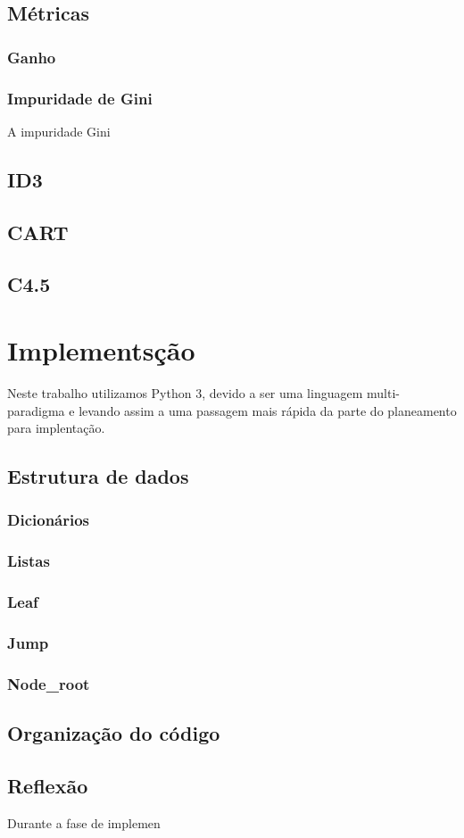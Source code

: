\documentclass[12pt,a4paper]{article}
\begin{document}
\subsection{Métricas}
\subsubsection{Ganho}

\subsubsection{Impuridade de Gini}
A impuridade Gini

\subsection{ID3}

\subsection{CART}

\subsection{C4.5}

\section{Implementsção}
Neste trabalho utilizamos Python 3, devido a ser uma linguagem multi-paradigma e levando assim a uma passagem mais rápida da parte do planeamento para implentação.
\subsection{Estrutura de dados}

\subsubsection{Dicionários}

\subsubsection{Listas}

\subsubsection{Leaf}

\subsubsection{Jump}

\subsubsection{Node_root}

\subsection{Organização do código}

\subsection{Reflexão}
Durante a fase de implemen


 
\end{document}
